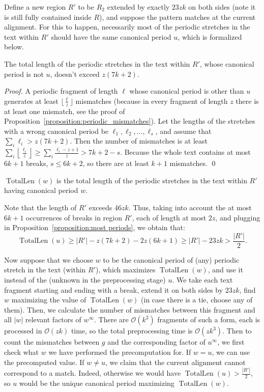 \documentclass[runningheads]{llncs}
\DeclareMathOperator{\TotalLen}{TotalLen}
\begin{document}
\begin{mycases}[listparindent=15pt]
Define a new region $R'$ to be $R_2$ extended by exactly $23zk$ on both sides (note it is still fully contained inside $R$), and suppose the pattern matches at the current alignment. For this to happen, necessarily most of the periodic stretches in the text within $R'$ should have the same canonical period $u$, which is formalized below.
\begin{proposition}
\label{proposition:most periods}
The total length of the periodic stretches in the text within $R'$, whose canonical period is not $u$, doesn't exceed $z(7k+2)$. 
\end{proposition}
\begin{proof}
A periodic fragment of length $\ell$ whose canonical period is other than $u$ generates at least $\lfloor \frac{\ell}{z} \rfloor$ mismatches (because in every fragment of length $z$ there is at least one mismatch, see the proof of Proposition~\ref{proposition:periodic_mismatches}).
Let the lengths of the stretches with a wrong canonical period be $\ell_{1},\ell_{2},\ldots,\ell_{s}$, and assume that $\sum_{i}\ell_{i} > z(7k+2)$. Then the number of mismatches is at least $\sum_{i}\left\lfloor\frac{\ell_{i}}{z}\right\rfloor \geq \sum_{i}\frac{\ell_{i}-z+1}{z}>7k+2-s$.  Because the whole text contains at most $6k+1$ breaks, $s\leq 6k+2$, so there are at least $k+1$ mismatches.
\qed
\end{proof}
\begin{definition}
$\TotalLen(w)$ is the total length of the periodic stretches in the text within $R'$ having canonical period $w$.
\end{definition} 
Note that the length of $R'$ exceeds $46zk$. Thus, taking into account the at most $6k+1$ occurrences of breaks in region $R'$, each of length at most $2z$, and plugging in Proposition~\ref{proposition:most periods}, we obtain that: $$\TotalLen(u)\geq |R'|-z(7k+2)-2z(6k+1)\geq |R'|-23zk>\frac{|R'|}{2}.$$

Now suppose that we choose $w$ to be the canonical period of (any) periodic stretch in the text (within $R'$), which maximizes $\TotalLen(w)$, and use it instead of the (unknown in the preprocessing stage) $u$. We take each text fragment starting and ending with a break, extend it on both sides by $23zk$, find $w$ maximizing the value of $\TotalLen(w)$ (in case there is a tie, choose any of them). Then, we calculate the number of mismatches between this fragment and all $|w|$ relevant factors of $w^{\infty}$. There are $\mathcal{O}(k^2)$ fragments of such a form, each is processed in $\mathcal{O}(zk)$ time, so the total preprocessing time is $\mathcal{O}(zk^{3})$. Then to count the mismatches between $g$ and the corresponding factor of $u^{\infty}$, we first check what $w$ we have performed the precomputation for. If $w=u$, we can use the precomputed value.
If $w\neq u$, we claim that the current alignment cannot correspond to a match. Indeed, otherwise we would have $\TotalLen(u)>\frac{|R'|}{2}$, so $u$ would be the unique canonical period maximizing $\TotalLen(w)$.
\end{mycases}
\end{document}
